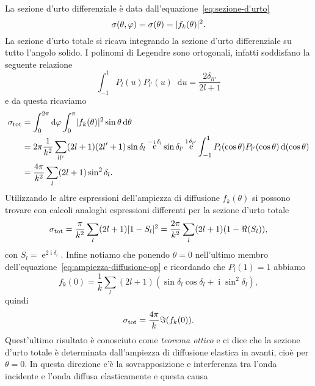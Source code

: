 \documentclass[a4paper,fleqn,twoside,12pt]{article}
\renewcommand{\phi}{\varphi}
\newcommand*{\dd}{\mathop{}\!\mathrm{d}} %
\DeclareMathOperator{\e}{\mathrm{e}} %
\DeclareMathOperator{\uimm}{\mathrm{i}} %
\DeclarePairedDelimiter{\abs}{\lvert}{\rvert}
\begin{document}
La sezione d'urto differenziale è data dall'equazione~\eqref{eq:sezione-d'urto}
\begin{equation}
  \sigma(\theta,\phi) = \sigma(\theta) = \abs{f_{k}(\theta)}^{2}.
\end{equation}
La sezione d'urto totale si ricava integrando la sezione d'urto differenziale su
tutto l'angolo solido.  I polinomi di Legendre sono ortogonali, infatti
soddisfano la seguente relazione
\begin{equation}
  \int_{-1}^{1}P_{l}(u)P_{l'}(u)\dd u = \frac{2\delta_{ll'}}{2l+1}
\end{equation}
e da questa ricaviamo
\begin{equation}
  \label{eq:serie-sfasamenti}
  \begin{split}
    \sigma_{\textup{tot}} &= \int_{0}^{2\pi}\dd \phi \int_{0}^{\pi}
    \abs{f_{k}(\theta)}^{2} \sin\theta \dd\theta \\
    &= 2\pi \frac{1}{k^{2}} \sum_{ll'}(2l+1)(2l'+1) \sin\delta_{l} \e^{-\uimm
      \delta_{l}} \sin\delta_{l'}\e^{\uimm \delta_{l'}}
    \int_{-1}^{1}P_{l}(\cos\theta)P_{l'}(\cos\theta) \dd(\cos\theta) \\
    &= \frac{4\pi}{k^{2}} \sum_{l}(2l+1)\sin^{2}\delta_{l}.
  \end{split}
\end{equation}
Utilizzando le altre espressioni dell'ampiezza di diffusione $f_{k}(\theta)$ si
possono trovare con calcoli analoghi espressioni differenti per la sezione
d'urto totale
\begin{equation}
  \sigma_{\textup{tot}} = \frac{\pi}{k^{2}} \sum_{l}(2l+1)\abs{1 - S_{l}}^{2} =
  \frac{2\pi}{k^{2}} \sum_{l}(2l+1)(1-\Re(S_{l})),
\end{equation}
con $S_{l} = \e^{2\uimm\delta_{l}}$.  Infine notiamo che ponendo $\theta = 0$
nell'ultimo membro dell'equazione~\eqref{eq:ampiezza-diffusione-op} e ricordando
che $P_{l}(1) = 1$ abbiamo
\begin{equation}
  f_{k}(0) = \frac{1}{k} \sum_{l}(2l+1)(\sin\delta_{l}\cos\delta_{l} + \uimm
  \sin^{2}\delta_{l}),
\end{equation}
quindi
\begin{equation}
  \sigma_{\textup{tot}} = \frac{4\pi}{k} \Im(f_{k}(0)).
\end{equation}
Quest'ultimo risultato è conosciuto come \emph{teorema ottico} e ci dice che la
sezione d'urto totale è determinata dall'ampiezza di diffusione elastica in
avanti, cioè per $\theta=0$.  In questa direzione c'è la sovrapposizione e
interferenza tra l'onda incidente e l'onda diffusa elasticamente e questa causa
\end{document}
